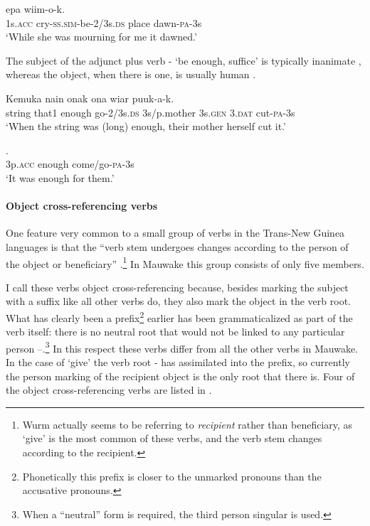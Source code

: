 \ea%
\label{ex:3:x1060}
\gll {}  epa wiim-o-k. \\
1s.\textsc{acc} cry-\textsc{ss}.\textsc{sim}-be-2/3s.\textsc{ds} place dawn-\textsc{pa}-3s\\
\glt`While she was mourning for me it dawned.'
\z

The subject of the adjunct plus verb - `be enough, suffice' is typically inanimate , whereas the object, when there is one, is usually human . 

\ea%
\label{ex:3:x1058}
\gll Kemuka nain   onak ona wiar puuk-a-k.\\
string that1 enough go-2/3s.\textsc{ds} 3s/p.mother 3s.\textsc{gen} 3.\textsc{dat} cut-\textsc{pa}-3s\\
\glt`When the string was (long) enough, their mother herself cut it.'
\z

\ea%
\label{ex:3:x306}
\gll {}  . \\
3p.\textsc{acc} enough come/go-\textsc{pa}-3s \\
\glt`It was enough for them.'
\z

\paragraph{Object cross-referencing verbs}\label{sec:3.8.4.2.4}
{}
One feature very common to a small group of verbs in the Trans-New Guinea languages is that the ``{verb stem undergoes changes according to the person of the object or beneficiary}'' \citep[62]{Wurm1982}.\footnote{Wurm actually seems to be referring to \textit{recipient} rather than beneficiary, as `give' is the most common of these verbs, and the verb stem changes according to the recipient.} In Mauwake this group consists of only five members. 

I call these verbs object cross-referencing because, besides marking the subject with a suffix like all other verbs do, they also  mark the object in the verb root. What has clearly been a prefix\footnote{Phonetically this prefix is closer to the unmarked pronouns than the accusative pronouns.} earlier has been grammaticalized as part of the verb itself: there is no neutral root that would not be linked to any particular person --.\footnote{When a ``neutral'' form is required, the third person singular is used.} In this respect these verbs differ from all the other verbs in Mauwake. In the case of `give' the verb root - has assimilated into the prefix, so currently the person marking of the recipient object is the only root that there is. Four of the object cross-referencing verbs are listed in .

